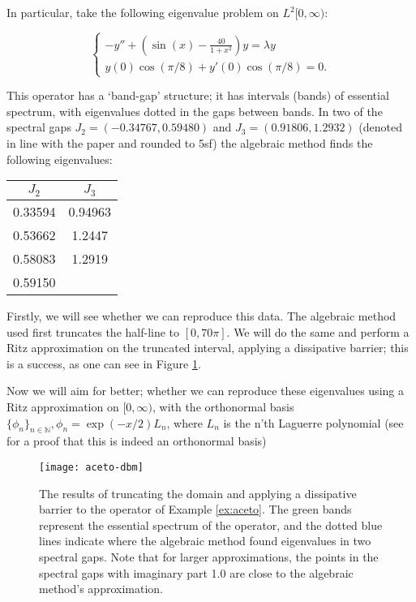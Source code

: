 \documentclass[../main.tex]{subfiles}
\begin{document}
\begin{example}\label{ex:aceto} In particular, take the following eigenvalue
	problem on $L^2[0, \infty)$:

$$ \begin{cases} -y'' + (\sin(x) - \frac{40}{1+x^2})y = \lambda y \\ y(0)
\cos(\pi/8) + y'(0) \cos(\pi/8) = 0. \end{cases} $$

This operator has a `band-gap' structure; it has intervals (bands) of essential
spectrum, with eigenvalues dotted in the gaps between bands. In two of
the spectral gaps $J_2 = (-0.34767, 0.59480)$ and $J_3 = (0.91806,
1.2932)$ (denoted in line with the paper and rounded to 5sf) the
algebraic method finds the following eigenvalues:

\begin{figure*}[h!]
\centering \begin{tabular}{c c}
  $J_2$ & $J_3$ \\
  \hline\hline
  0.33594 & 0.94963 \\
  0.53662 & 1.2447 \\
  0.58083 & 1.2919 \\
  0.59150 & \\
\end{tabular}
\end{figure*}

Firstly, we will see whether we can reproduce this data. The algebraic method
used first truncates the half-line to $[0, 70\pi]$. We will do the same
and perform a Ritz approximation on the truncated interval, applying a
dissipative barrier; this is a success, as one can see in Figure
\ref{fig:aceto-dbm}.

Now we will aim for better; whether we can reproduce these eigenvalues using a
Ritz approximation on $[0, \infty)$, with the orthonormal basis
$\{\phi_n\}_{n \in \mathbb{N}}, \phi_n = \exp(-x/2)L_n$, where $L_n$ is
the n'th Laguerre polynomial (see \cite{szego1975orthogonal} for a proof
that this is indeed an orthonormal basis) \end{example}

\begin{figure}[p!] %
\texttt{[image: aceto-dbm]}
\caption{The results of truncating the domain and applying a dissipative
	barrier to the operator of Example \ref{ex:aceto}. The green bands
	represent the essential spectrum of the operator, and the dotted blue
	lines indicate where the algebraic method found eigenvalues in two
	spectral gaps. Note that for larger approximations, the points in the
	spectral gaps with imaginary part 1.0 are close to the algebraic
	method's approximation.}
\label{fig:aceto-dbm}
\end{figure}
\clearpage
\end{document}
